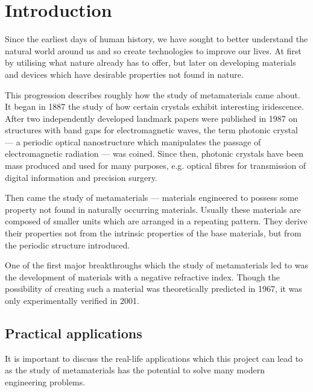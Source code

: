 \chapter{Introduction}
Since the earliest days of human history, we have sought to better understand
the natural world around us and so create technologies to improve our lives. At
first by utilising what nature already has to offer, but later on developing
materials and devices which have desirable properties not found in nature.

This progression describes roughly how the study of metamaterials came about.
It began in 1887 the study of how certain crystals exhibit interesting
iridescence.\cite{pcearliest} After two independently developed landmark
papers were published in 1987 on structures with band gaps for electromagnetic
waves,\cite{pceli,pcjohn} the term photonic crystal --- a periodic optical
nanostructure which manipulates the passage of electromagnetic radiation ---
was coined.\cite{pcfocus} Since then, photonic crystals have been mass produced
and used for many purposes, e.g. optical fibres for transmission of digital
information \cite{pcopfib} and precision surgery.\cite{pcsurgery,pcneuro}

Then came the study of metamaterials --- materials engineered to possess some
property not found in naturally occurring materials.\cite{briefintro} Usually
these materials are composed of smaller units which are arranged in a repeating
pattern. They derive their properties not from the intrinsic properties of the
base materials, but from the periodic structure introduced.

One of the first major breakthroughs which the study of metamaterials led to
was the development of materials with a negative refractive index. Though the
possibility of creating such a material was theoretically predicted in
1967,\cite{negrefrac} it was only experimentally verified in
2001.\cite{negrefracex}

\section{Practical applications}
It is important to discuss the real-life applications which this project can
lead to as the study of metamaterials has the potential to solve many modern
engineering problems.

